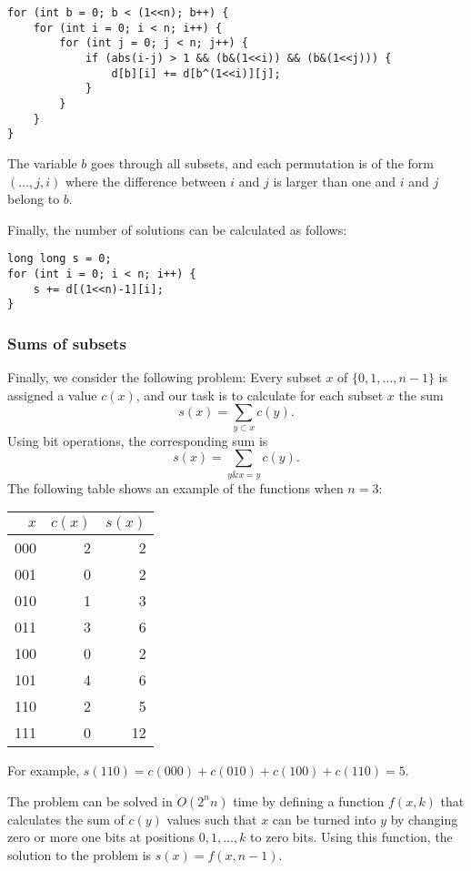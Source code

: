 \begin{lstlisting}
for (int b = 0; b < (1<<n); b++) {
    for (int i = 0; i < n; i++) {
        for (int j = 0; j < n; j++) {
            if (abs(i-j) > 1 && (b&(1<<i)) && (b&(1<<j))) {
                d[b][i] += d[b^(1<<i)][j];
            }
        }
    }
}
\end{lstlisting}

\noindent
The variable $b$ goes through all subsets, and each
permutation is of the form $(\ldots,j,i)$
where the difference between $i$ and $j$ is
larger than one and $i$ and $j$ belong to $b$.

Finally, the number of solutions can be
calculated as follows:

\begin{lstlisting}
long long s = 0;
for (int i = 0; i < n; i++) {
    s += d[(1<<n)-1][i];
}
\end{lstlisting}

\subsubsection{Sums of subsets}

Finally, we consider the following problem:
Every subset $x$
of $\{0,1,\ldots,n-1\}$
is assigned a value $c(x)$,
and our task is to calculate for
each subset $x$ the sum
\[s(x)=\sum_{y \subset x} c(y).\]
Using bit operations, the corresponding sum is
\[s(x)=\sum_{y \& x = y} c(y).\]
The following table shows an example of
the functions when $n=3$:
\begin{center}
\begin{tabular}{rrr}
$x$ & $c(x)$ & $s(x)$ \\
\hline
000 & 2 & 2 \\
001 & 0 & 2 \\
010 & 1 & 3 \\
011 & 3 & 6 \\
100 & 0 & 2 \\
101 & 4 & 6 \\
110 & 2 & 5 \\
111 & 0 & 12 \\
\end{tabular}
\end{center}
For example, $s(110)=c(000)+c(010)+c(100)+c(110)=5$. 

The problem can be solved in $O(2^n n)$ time
by defining a function $f(x,k)$ that calculates
the sum of $c(y)$ values such that $x$ can be
turned into $y$ by changing zero or more one bits
at positions $0,1,\ldots,k$ to zero bits.
Using this function, the solution to the
problem is $s(x)=f(x,n-1)$.

